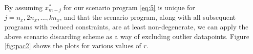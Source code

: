 \documentclass[11pt]{article}
\begin{document}
By assuming $x^{*}_{m-j}$ for our scenario program \ref{eq:5} is unique for $j=n_{x},2n_{x},...,kn_{x}$, and that the scenario program, along with all subsequent programs with reduced constraints, are at least non-degenerate, we can apply the above scenario discarding scheme as a way of excluding outlier datapoints. Figure \ref{fig:pac2} shows the plots for various values of $r$.



\begin{figure}[!htb]
	\centering
	\hfill
	\hfill
    \caption{}

\end{figure}
\end{document}
